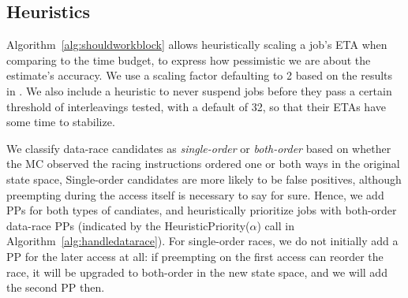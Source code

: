 
\subsection{Heuristics}
Algorithm~\ref{alg:shouldworkblock} allows heuristically scaling a job's ETA when comparing to the time budget,
to express how pessimistic we are about the estimate's accuracy.
We use a scaling factor defaulting to 2 based on the results in \cite{estimation}.
We also include a heuristic to
never suspend jobs before they pass a certain threshold of interleavings tested,
with a default of 32,
so that their ETAs have some time to stabilize.

We classify data-race candidates as {\em single-order} or {\em both-order} \cite{portend}
based on whether the MC observed the racing instructions ordered one or both ways in the original state space,
Single-order candidates are more likely to be false positives,
although preempting during the access itself is necessary to say for sure.
Hence, we add PPs for both types of candiates, and heuristically prioritize jobs with both-order data-race PPs
(indicated by the HeuristicPriority($\alpha$) call in Algorithm~\ref{alg:handledatarace}).
For single-order races, we do not initially add a PP for the later access at all:
if preempting on the first access can reorder the race, it will be upgraded to both-order in the new state space, and we will add the second PP then.
